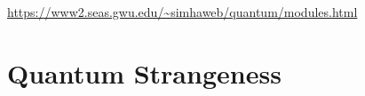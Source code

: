 \url{https://www2.seas.gwu.edu/~simhaweb/quantum/modules.html}

\section{Quantum Strangeness}


%

%








